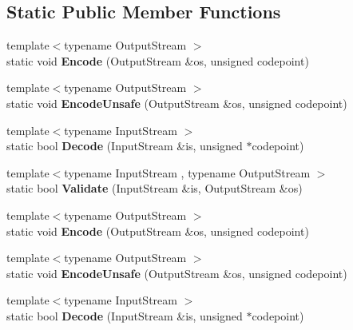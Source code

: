 \subsection*{Static Public Member Functions}
\begin{DoxyCompactItemize}
\item 
{\footnotesize template$<$typename Output\+Stream $>$ }\\static void {\bfseries Encode} (Output\+Stream \&os, unsigned codepoint)\hypertarget{struct_u_t_f16_a9d8ded01244e30d037c4afa10ee2b30e}{}\label{struct_u_t_f16_a9d8ded01244e30d037c4afa10ee2b30e}

\item 
{\footnotesize template$<$typename Output\+Stream $>$ }\\static void {\bfseries Encode\+Unsafe} (Output\+Stream \&os, unsigned codepoint)\hypertarget{struct_u_t_f16_aa67661e756c273871b574e7133b7fc63}{}\label{struct_u_t_f16_aa67661e756c273871b574e7133b7fc63}

\item 
{\footnotesize template$<$typename Input\+Stream $>$ }\\static bool {\bfseries Decode} (Input\+Stream \&is, unsigned $\ast$codepoint)\hypertarget{struct_u_t_f16_a124c79dfd9f9b4c3fb65bd55ba17b4be}{}\label{struct_u_t_f16_a124c79dfd9f9b4c3fb65bd55ba17b4be}

\item 
{\footnotesize template$<$typename Input\+Stream , typename Output\+Stream $>$ }\\static bool {\bfseries Validate} (Input\+Stream \&is, Output\+Stream \&os)\hypertarget{struct_u_t_f16_a7516184ed5dce10c0e7895bec124d97d}{}\label{struct_u_t_f16_a7516184ed5dce10c0e7895bec124d97d}

\item 
{\footnotesize template$<$typename Output\+Stream $>$ }\\static void {\bfseries Encode} (Output\+Stream \&os, unsigned codepoint)\hypertarget{struct_u_t_f16_a9d8ded01244e30d037c4afa10ee2b30e}{}\label{struct_u_t_f16_a9d8ded01244e30d037c4afa10ee2b30e}

\item 
{\footnotesize template$<$typename Output\+Stream $>$ }\\static void {\bfseries Encode\+Unsafe} (Output\+Stream \&os, unsigned codepoint)\hypertarget{struct_u_t_f16_aa67661e756c273871b574e7133b7fc63}{}\label{struct_u_t_f16_aa67661e756c273871b574e7133b7fc63}

\item 
{\footnotesize template$<$typename Input\+Stream $>$ }\\static bool {\bfseries Decode} (Input\+Stream \&is, unsigned $\ast$codepoint)\hypertarget{struct_u_t_f16_a124c79dfd9f9b4c3fb65bd55ba17b4be}{}\label{struct_u_t_f16_a124c79dfd9f9b4c3fb65bd55ba17b4be}


\end{DoxyCompactItemize}
